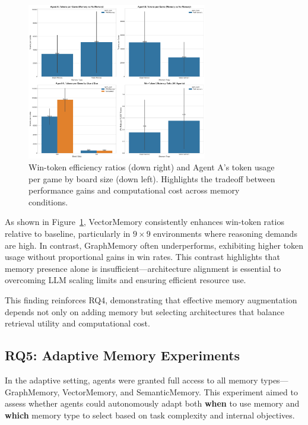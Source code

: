 \documentclass[10pt]{article}
\begin{document}
\begin{figure}[ht]
\centering
\includegraphics[width=0.7\textwidth]{figures/memory_baseline/memory_token_efficiency.png}
\caption{Win-token efficiency ratios (down right) and Agent A's token usage per game by board size (down left). Highlights the tradeoff between performance gains and computational cost across memory conditions.}
\label{fig:memory_efficiency_tradeoff}
\end{figure}

As shown in Figure~\ref{fig:memory_efficiency_tradeoff}, VectorMemory consistently enhances win-token ratios relative to baseline, particularly in $9\times9$ environments where reasoning demands are high. In contrast, GraphMemory often underperforms, exhibiting higher token usage without proportional gains in win rates. This contrast highlights that memory presence alone is insufficient—architecture alignment is essential to overcoming LLM scaling limits and ensuring efficient resource use.

This finding reinforces RQ4, demonstrating that effective memory augmentation depends not only on adding memory but selecting architectures that balance retrieval utility and computational cost.

\subsection{RQ5: Adaptive Memory Experiments}

In the adaptive setting, agents were granted full access to all memory types—GraphMemory, VectorMemory, and SemanticMemory. This experiment aimed to assess whether agents could autonomously adapt both \textbf{when} to use memory and \textbf{which} memory type to select based on task complexity and internal objectives.
\end{document}
